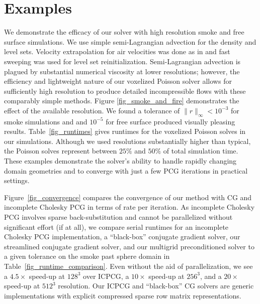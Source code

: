 \section{Examples}
We demonstrate the efficacy of our solver with high resolution smoke and free surface simulations. We use simple semi-Lagrangian advection \cite{S99} for the density and level
sets. Velocity extrapolation for air velocities was done as in \cite{ZB05} and fast sweeping \cite{Z04} was used for level set reinitialization. Semi-Lagrangian advection 
is plagued by substantial numerical viscosity at lower resolutions; however, the efficiency and lightweight nature of our voxelized Poisson solver allows for sufficiently high resolution
to produce detailed incompressible flows with these comparably simple methods. Figure \ref{fig_smoke_and_fire} demonstrates the effect of the available resolution.  We found a tolerance of $\|r\|_{\infty}<10^{-3}$ for smoke simulations and and $10^{-5}$ for free surface produced visually pleasing results.
Table~\ref{fig_runtimes} gives runtimes for the voxelized Poisson solves in our simulations.  Although we used resolutions substantially higher than typical, the Poisson solves represent between $25\%$ and $50\%$ of total simulation time. 
These examples demonstrate the solver's ability to handle rapidly changing domain geometries and to converge with just a few PCG iterations in practical
settings. 

Figure~\ref{fig_convergence} compares the convergence of our method with CG and incomplete Cholesky PCG in terms of rate per iteration. As incomplete Cholesky PCG involves sparse back-substitution and cannot be parallelized without significant effort (if at all), we compare serial runtimes for an incomplete Cholesky PCG implementation, a ``black-box'' conjugate gradient solver, our streamlined conjugate gradient solver, and our multigrid preconditioned solver to a given tolerance on the smoke past sphere domain in Table~\ref{fig_runtime_comparison}.  Even without the aid of parallelization, we see a $4.5\times$ speed-up at $128^3$ over ICPCG, a $10\times$ speed-up at $256^3$, and a $20\times$ speed-up at $512^3$ resolution.  Our ICPCG and ``black-box'' CG solvers are generic implementations with explicit compressed sparse row matrix representations.


